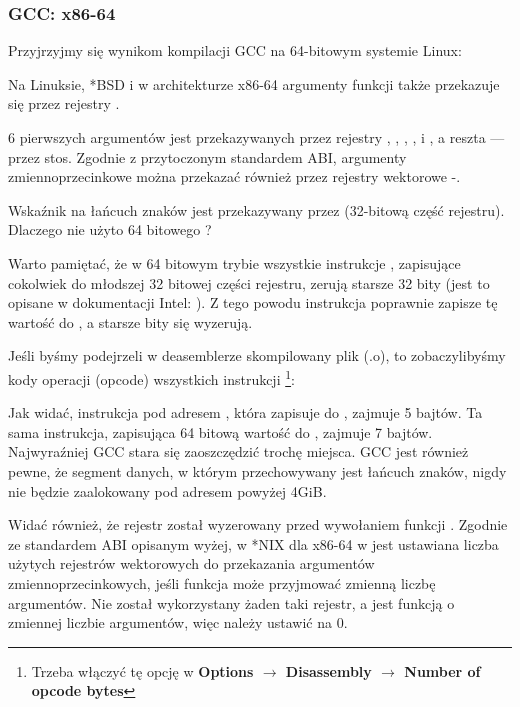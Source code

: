 \subsubsection{GCC: x86-64}

Przyjrzyjmy się wynikom kompilacji GCC na 64-bitowym systemie Linux:



Na Linuksie, *BSD i \MacOSX w architekturze x86-64 argumenty funkcji także przekazuje się przez rejestry \SysVABI.

6 pierwszych argumentów jest przekazywanych przez rejestry \RDI, \RSI, \RDX, \RCX,  i , a reszta --- przez stos.
Zgodnie z przytoczonym standardem ABI, argumenty zmiennoprzecinkowe można przekazać również przez rejestry wektorowe -.

Wskaźnik na łańcuch znaków jest przekazywany przez \EDI (32-bitową część rejestru). Dlaczego nie użyto 64 bitowego \RDI?

Warto pamiętać, że w 64 bitowym trybie wszystkie instrukcje \MOV, zapisujące cokolwiek do młodszej 32 bitowej części rejestru, zerują starsze 32 bity (jest to opisane w dokumentacji Intel: ).
Z tego powodu instrukcja  poprawnie zapisze tę wartość do \RAX, a starsze bity się wyzerują.

Jeśli byśmy podejrzeli w deasemblerze \IDA skompilowany plik (.o), to zobaczylibyśmy kody operacji (opcode) wszystkich instrukcji
\footnote{Trzeba włączyć tę opcję w \textbf{Options $\rightarrow$ Disassembly $\rightarrow$ Number of opcode bytes}}:



\label{hw_EDI_instead_of_RDI}
Jak widać, instrukcja \MOV pod adresem , która zapisuje do \EDI, zajmuje 5 bajtów.
Ta sama instrukcja, zapisująca 64 bitową wartość do \RDI, zajmuje 7 bajtów.
Najwyraźniej GCC stara się zaoszczędzić trochę miejsca.
GCC jest również pewne, że segment danych, w którym przechowywany jest łańcuch znaków, nigdy nie będzie zaalokowany pod adresem powyżej 4\gls{GiB}.

\label{SysVABI_input_EAX}
Widać również, że rejestr \EAX został wyzerowany przed wywołaniem funkcji \printf.
Zgodnie ze standardem ABI opisanym wyżej, w *NIX dla x86-64 w \EAX jest ustawiana liczba użytych rejestrów wektorowych do przekazania argumentów zmiennoprzecinkowych, jeśli funkcja może przyjmować zmienną liczbę argumentów.
Nie został wykorzystany żaden taki rejestr, a \printf jest funkcją o zmiennej liczbie argumentów, więc należy ustawić \EAX na 0.
